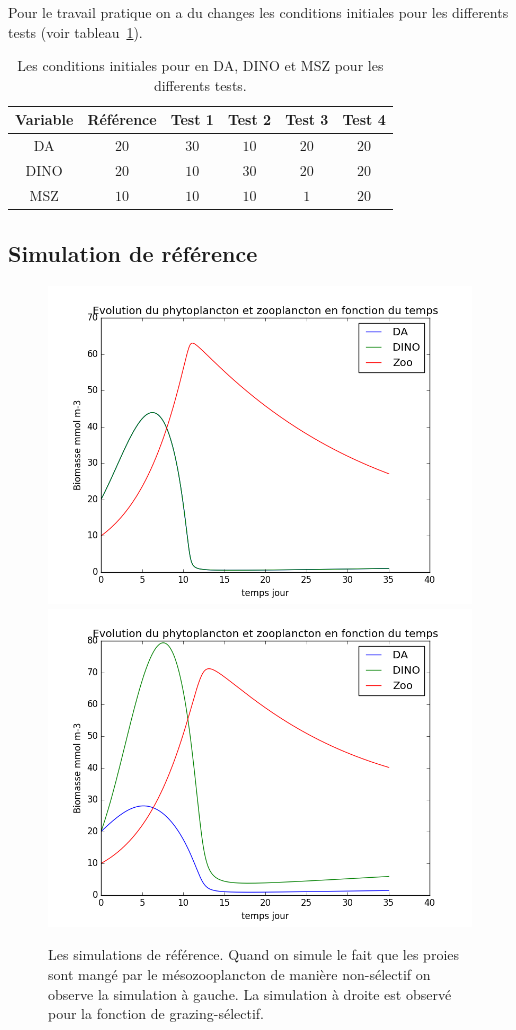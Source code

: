\par{
Pour le travail pratique on a du changes les conditions initiales pour les differents tests
(voir tableau~\ref{tab:partie2params}).
}

\begin{table}[h!]
\begin{center}
\begin{tabular}{ | c | c | c | c | c | c | }
\hline
Variable & Référence & Test 1 & Test 2 & Test 3 & Test 4 \\
\hline
DA & $20$ & $30$ & $10$ & $20$ & $20$ \\
DINO & $20$ & $10$ & $30$ & $20$ & $20$ \\
MSZ & $10$ & $10$ & $10$ & $1$ & $20$ \\
\hline
\end{tabular}
\end{center}
  \caption{Les conditions initiales pour en DA, DINO et MSZ pour les differents tests.}
  \label{tab:partie2params}
\end{table}

\clearpage
\subsection{Simulation de référence}

\begin{figure}[h!]
  \includegraphics[width=.5\textwidth]{partie2/1Nonselec.png}\hfill
  \includegraphics[width=.5\textwidth]{partie2/1Selec.png}
  \caption{Les simulations de référence. Quand on simule le fait que les proies sont mangé par le
mésozooplancton de manière non-sélectif on observe la simulation à gauche. La simulation à droite
est observé pour la fonction de grazing-sélectif.
}
  \label{fig:partie2Ref}
\end{figure}

